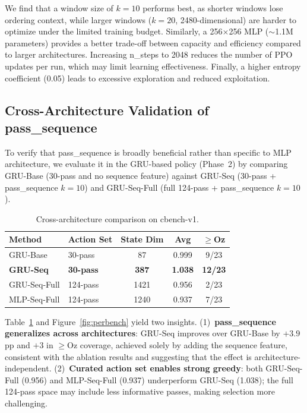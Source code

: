 \documentclass{article}
\begin{document}
We find that a window size of $k=10$ performs best, as shorter windows lose ordering context, while larger windows ($k=20$, 2480-dimensional) are harder to optimize under the limited training budget. Similarly, a 256$\times$256 MLP ($\sim$1.1M parameters) provides a better trade-off between capacity and efficiency compared to larger architectures. Increasing n\_steps to 2048 reduces the number of PPO updates per run, which may limit learning effectiveness. Finally, a higher entropy coefficient (0.05) leads to excessive exploration and reduced exploitation.

\subsection{Cross-Architecture Validation of pass\_sequence}
\label{sec:crossarch}

To verify that pass\_sequence is broadly beneficial rather than specific to 
MLP architecture, we evaluate it in the GRU-based policy (Phase~2) by
comparing GRU-Base (30-pass and no sequence feature) against GRU-Seq (30-pass
+ pass\_sequence $k{=}10$) and GRU-Seq-Full (full 124-pass + pass\_sequence
$k{=}10$).

\begin{table}[h]
  \caption{Cross-architecture comparison on cbench-v1.}
  \label{tab:crossarch}
  \centering
  \begin{tabular}{llccc}
    \toprule
    Method & Action Set & State Dim & Avg & $\geq$Oz \\
    \midrule
    GRU-Base          & 30-pass       & 87   & 0.999 &  9/23 \\
    \textbf{GRU-Seq}   & \textbf{30-pass}       & \textbf{387}  & \textbf{1.038} & \textbf{12/23} \\
    GRU-Seq-Full   & 124-pass      & 1421 & 0.956 &  2/23 \\
    \midrule
    MLP-Seq-Full  & 124-pass      & 1240 & 0.937 &  7/23 \\
    \bottomrule
  \end{tabular}
\end{table}

Table~\ref{tab:crossarch} and Figure~\ref{fig:perbench} yield two insights.
(1)~\textbf{pass\_sequence generalizes across architectures}: GRU-Seq improves over GRU-Base by $+3.9$pp and $+3$ in $\geq$Oz coverage, achieved solely by adding the sequence feature, consistent with the ablation results and suggesting that the effect is architecture-independent.
(2)~\textbf{Curated action set enables strong greedy}: both GRU-Seq-Full (0.956) and MLP-Seq-Full (0.937) underperform GRU-Seq (1.038);
the full 124-pass space may include less informative passes, making selection more challenging.
\end{document}
